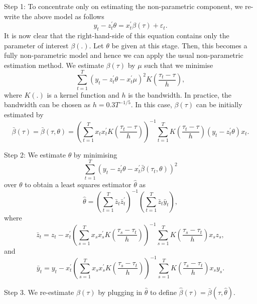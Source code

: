 \documentclass[12pt,a4paper]{article}
\begin{document}
Step 1: To concentrate only on estimating the non-parametric component, we re-write the above model as follows
\[
y_{t}-z_{t}^{\prime }\theta =x_{t}^{\prime }\beta \left( \tau \right) +\varepsilon _{t}. 
\]%
It is now clear that the right-hand-side of this equation contains only the parameter of interest $\beta \left(.\right) $. Let $\theta $ be given at this stage. Then, this becomes a fully non-parametric model and hence we can apply the usual non-parametric estimation method. We estimate $\beta \left( \tau \right) $ by $%
\mu $ such that we minimise 
\[
\sum_{t=1}^{T}\left( y_{t}-z_{t}^{\prime }\theta -x_{t}^{\prime }\mu \right)
^{2}K\left( \frac{\tau _{t}-\tau }{h}\right), 
\]%
where $K\left( .\right) $ is a kernel function and $h$ is the bandwidth. In practice, the bandwidth can be chosen as $h=0.3T^{-1/5}$. In
this case, $\beta \left( \tau \right) $ can be initially estimated by 
\[
\bar{\beta}\left( \tau \right) =\bar{\beta}\left( \tau ,\theta \right)
=\left( \sum_{t=1}^{T}x_{t}x_{t}^{\prime }K\left( \frac{\tau _{t}-\tau }{h}%
\right) \right) ^{-1}\sum_{t=1}^{T}K\left( \frac{\tau _{t}-\tau }{h}\right)
\left( y_{t}-z_{t}^{\prime }\theta \right) x_{t}. 
\]

Step 2: We estimate $\theta $ by minimising 
\[
\sum_{t=1}^{T}\left( y_{t}-z_{t}^{\prime }\theta -x_{t}^{\prime }\bar{\beta}%
\left( \tau _{t},\theta \right) \right) ^{2} 
\]%
over $\theta $ to obtain a least squares estimator $\hat{\theta}$ as%
\[
\widehat{\theta}=\left(\sum_{t=1}^{T} \bar{z}_t\bar{z}_t^{\prime}\right)^{-1} \left(\sum_{t=1}^{T} \bar{z}_t \bar{y}_t\right), 
\]%
where%
\[
\bar{z}_{t}= z_t - x_t^{\prime} \left(\sum_{s=1}^{T} x_s x_s^{\prime}  K(\dfrac{\tau_{s} - \tau_t}{h}) \right)^{-1}\sum_{s=1}^{T} K(\dfrac{\tau_{s} - \tau_t}{h}) x_s z_s,
\]%
and%
\[
\bar{y}_{t}= y_t - x_t^{\prime} \left(\sum_{s=1}^{T} x_s x_s^{\prime} K(\dfrac{\tau_{s} - \tau_t}{h}) \right)^{-1}\sum_{s=1}^{T} K(\dfrac{\tau_{s} - \tau_t}{h}) x_s y_s.
\]

Step 3. We re-estimate $\beta \left( \tau \right) $ by plugging in $\widehat{\theta}$ to define $\widehat{\beta}\left( \tau \right) =\bar{\beta}\left( \tau ,\widehat{\theta}\right)$. 
\end{document}
